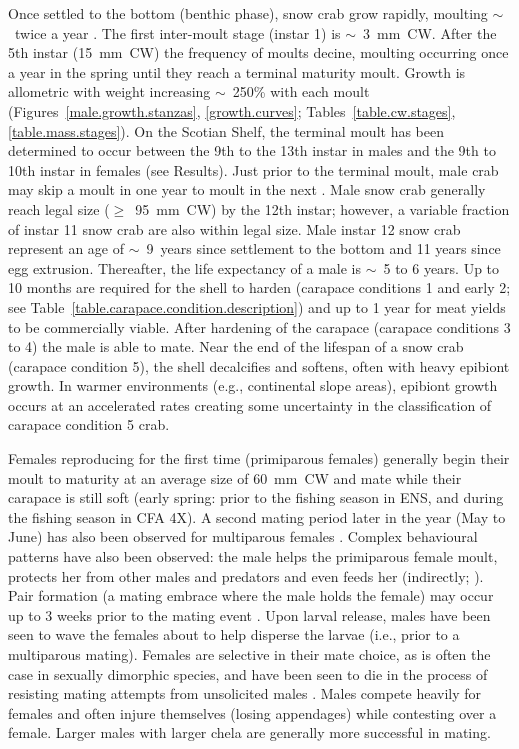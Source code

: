 \documentclass[11pt]{article}
\begin{document}
Once settled to the bottom (benthic phase), snow crab grow rapidly, moulting $\sim$~twice a year \citep{Sainte-Marie1995, Comeau1998}. The first inter-moult stage (instar 1) is $\sim$~3~mm~CW. After the 5th instar (15~mm~CW) the frequency of moults decine, moulting occurring once a year in the spring until they reach a terminal maturity moult. Growth is allometric with weight increasing $\sim$~250\% with each moult (Figures~\ref{male.growth.stanzas}, \ref{growth.curves}; Tables~\ref{table.cw.stages}, \ref{table.mass.stages}). On the Scotian Shelf, the terminal moult has been determined to occur between the 9th to the 13th instar in males and the 9th to 10th instar in females (see Results). Just prior to the terminal moult, male crab may skip a moult in one year to moult in the next \citep{ConanComeauRobichaud1992}. Male snow crab generally reach legal size ($\geq$~95~mm~CW) by the 12th instar; however, a variable fraction of instar 11 snow crab are also within legal size. Male instar 12 snow crab represent an age of $\sim$~9~years since settlement to the bottom and 11 years since egg extrusion. Thereafter, the life expectancy of a male is $\sim$~5 to 6 years. Up to 10 months are required for the shell to harden (carapace conditions 1 and early 2; see Table~\ref{table.carapace.condition.description}) and up to 1 year for meat yields to be commercially viable. After hardening of the carapace (carapace conditions 3 to 4) the male is able to mate. Near the end of the lifespan of a snow crab (carapace condition 5), the shell decalcifies and softens, often with heavy epibiont growth. In warmer environments (e.g., continental slope areas), epibiont growth occurs at an accelerated rates creating some uncertainty in the classification of carapace condition 5 crab.

Females reproducing for the first time (primiparous females) generally begin their moult to maturity at an average size of 60~mm~CW and mate while their carapace is still soft (early spring: prior to the fishing season in ENS, and during the fishing season in CFA 4X). A second mating period later in the year (May to June) has also been observed for multiparous females \citep{Hooper1986}. Complex behavioural patterns have also been observed: the male helps the primiparous female moult, protects her from other males and predators and even feeds her (indirectly; \citealt{Hooper1986}). Pair formation (a mating embrace where the male holds the female) may occur up to 3 weeks prior to the mating event \citep{Hooper1986}. Upon larval release, males have been seen to wave the females about to help disperse the larvae (i.e., prior to a multiparous mating). Females are selective in their mate choice, as is often the case in sexually dimorphic species, and have been seen to die in the process of resisting mating attempts from unsolicited males \citep{Watson1972, Hooper1986}. Males compete heavily for females and often injure themselves (losing appendages) while contesting over a female. Larger males with larger chela are generally more successful in mating.
\end{document}
